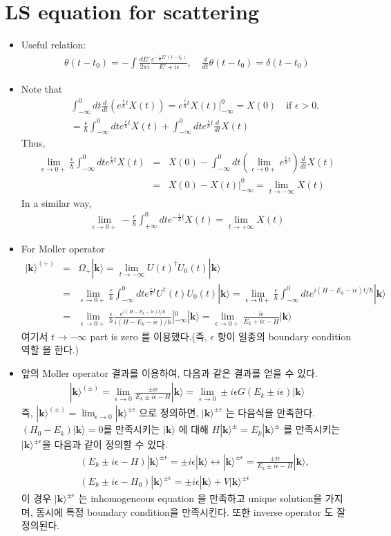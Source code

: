 \documentclass[10pt]{book}
\def\bm{\boldsymbol}
\newcommand{\bea}{\begin{eqnarray}}
\newcommand{\eea}{\end{eqnarray}}
\newcommand{\no}{\nonumber \\}
\def\vk{{\bm k}}
\def\ra{\rangle}
\begin{document}
\section{LS equation for scattering}
\begin{itemize}
\item Useful relation:
  \bea 
  \theta(t-t_0)=-\int\frac{dE'}{2\pi i} 
  \frac{e^{-\frac{i}{\hbar} E'(t-t_0)} }{E'+i\epsilon},
  \quad \frac{d}{dt}\theta(t-t_0)=\delta(t-t_0)
  \eea 
\item 
  Note that 
  \bea 
  & &\int_{-\infty}^0 dt \frac{d}{dt}\left( 
       e^{\frac{\epsilon}{\hbar} t} X(t)\right) 
  = e^{\frac{\epsilon}{\hbar} t} X(t)|^0_{-\infty}
  =X(0)\quad \mbox{if }\epsilon >0. \no       
   & & = \frac{\epsilon}{\hbar}\int_{-\infty}^0 dt  
               e^{\frac{\epsilon}{\hbar} t} X(t)
       +\int_{-\infty}^0 dt e^{\frac{\epsilon}{\hbar} t} \frac{d}{dt} X(t)
  \eea 
  Thus,
  \bea 
  \lim_{\epsilon\to 0+}\frac{\epsilon}{\hbar}\int_{-\infty}^0 dt  
                 e^{\frac{\epsilon}{\hbar} t} X(t)
               &=& X(0)- \int_{-\infty}^0 dt \left(\lim_{\epsilon\to 0+} e^{\frac{\epsilon}{\hbar} t}\right)  \frac{d}{dt} X(t)\no  
               &=& X(0)- X(t)|^0_{-\infty}=\lim_{t\to -\infty} X(t)
  \eea 
  In a similar way,
    \bea 
    \lim_{\epsilon\to 0+}-\frac{\epsilon}{\hbar}\int_{+\infty}^0 dt  
                   e^{-\frac{\epsilon}{\hbar} t} X(t)
             =\lim_{t\to +\infty} X(t)
    \eea 
\item For Moller operator
  \bea
  |\vk\ra^{(+)}&=& \Omega_{+}|\vk\ra =\lim_{t\to -\infty} U(t)^\dagger U_0(t)|\vk\ra  \no 
  &=&\lim_{\epsilon\to 0+}\frac{\epsilon}{\hbar}\int_{-\infty}^0 dt  
                     e^{\frac{\epsilon}{\hbar} t} U^\dagger(t)U_0(t)|\vk\ra  
   = \lim_{\epsilon\to 0+}
    \frac{\epsilon}{\hbar}\int_{-\infty}^0 dt 
    e^{i (H-E_k-i\epsilon)  t/\hbar} |\vk\ra \no 
  & =& \lim_{\epsilon\to 0+}\frac{\epsilon}{\hbar}\frac{e^{i (H-E_k-i\epsilon)  t/\hbar}}
      {i (H-E_k-i\epsilon)/\hbar}|_{-\infty}^0 |\vk\ra 
     = \lim_{\epsilon\to 0+}\frac{i\epsilon}{E_k+i\epsilon-H}|\vk\ra 
  \eea     
  여기서 $t\to-\infty$ part is zero 를 이용했다.(즉, $\epsilon$ 항이 일종의 
   boundary condition역할 을 한다.)
\item
 앞의 Moller operator 결과를 이용하여, 다음과 같은 결과를 얻을 수 있다.
\bea
\boxed{ 
|\vk\ra^{(\pm)}
=\lim_{\epsilon\to 0}\frac{\pm i\epsilon}{E_k\pm i\epsilon-H}|\vk\ra
=\lim_{\epsilon\to 0}\pm i\epsilon G(E_k\pm i\epsilon)|\vk\ra }
\eea
즉,  $|\vk\ra^{(\pm)}=\lim_{\epsilon\to 0}|\vk\ra^{\pm \epsilon}$ 으로 정의하면,
$|\vk\ra^{\pm \epsilon}$ 는 다음식을 만족한다.  
$(H_0-E_k)|\vk\ra=0$를 만족시키는 $|\vk\ra$ 에 대해 
$H|\vk\ra^{\pm}=E_k|\vk\ra^{\pm}$ 를 만족시키는 $|\vk\ra^{\pm\epsilon}$을 다음과 같이 정의할 수 있다.
\bea
& &(E_k\pm i\epsilon -H)|\vk\ra^{\pm \epsilon} = \pm i \epsilon|\vk\ra  
\leftrightarrow  |\vk\ra^{\pm \epsilon}= \frac{\pm i\epsilon}{E_k\pm i\epsilon-H}|\vk\ra,\no 
& &(E_k\pm i\epsilon -H_0)|\vk\ra^{\pm \epsilon}=\pm i\epsilon|\vk\ra +V|\vk\ra^{\pm \epsilon}
\eea 
이 경우 $ |\vk\ra^{\pm \epsilon}$ 는 inhomogeneous equation 을 만족하고 unique solution을 가지며,
동시에 특정 boundary condition을 만족시킨다. 또한 inverse operator 도 잘 정의된다.  


\end{itemize}
\end{document}
